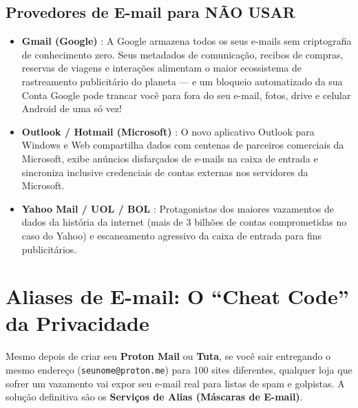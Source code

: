 \documentclass{pousadaguide}
\begin{document}
\subsection{Provedores de E-mail para NÃO USAR}

\begin{perigo}
\begin{itemize}
  \item \textbf{Gmail (Google)} : A Google armazena todos os seus e-mails sem criptografia de conhecimento zero. Seus metadados de comunicação, recibos de compras, reservas de viagens e interações alimentam o maior ecossistema de rastreamento publicitário do planeta — e um bloqueio automatizado da sua Conta Google pode trancar você para fora do seu e-mail, fotos, drive e celular Android de uma só vez!
  \item \textbf{Outlook / Hotmail (Microsoft)} : O novo aplicativo Outlook para Windows e Web compartilha dados com centenas de parceiros comerciais da Microsoft, exibe anúncios disfarçados de e-mails na caixa de entrada e sincroniza inclusive credenciais de contas externas nos servidores da Microsoft.
  \item \textbf{Yahoo Mail / UOL / BOL} : Protagonistas dos maiores vazamentos de dados da história da internet (mais de 3 bilhões de contas comprometidas no caso do Yahoo) e escaneamento agressivo da caixa de entrada para fins publicitários.
\end{itemize}
\end{perigo}

\section{Aliases de E-mail: O “Cheat Code” da Privacidade}

Mesmo depois de criar seu \textbf{Proton Mail} ou \textbf{Tuta}, se você sair entregando o mesmo endereço (\texttt{seunome@proton.me}) para 100 sites diferentes, qualquer loja que sofrer um vazamento vai expor seu e-mail real para listas de spam e golpistas. A solução definitiva são os \textbf{Serviços de Alias (Máscaras de E-mail)}.
\end{document}
